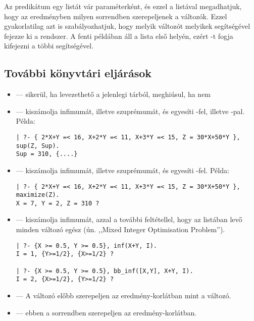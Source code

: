 Az  predikátum egy listát vár paraméterként, és ezzel a
listával megadhatjuk, hogy az eredményben milyen sorrendben szerepeljenek
a változók. Ezzel gyakorlatilag azt is szabályozhatjuk, hogy melyik változót
melyikek segítségével fejezze ki a rendszer. A fenti példában  áll a
lista első helyén, ezért -t fogja kifejezni a többi segítségével.

\subsection{További könyvtári eljárások}

\begin{itemize}
\item {} --- sikerül, ha  levezethető a
jelenlegi tárból, meghiúsul, ha nem

\item {} --- kiszámolja  infimumát,
illetve szuprémumát, és egyesíti -fel, illetve -pal.
Példa:

\begin{verbatim}
| ?- { 2*X+Y =< 16, X+2*Y =< 11, X+3*Y =< 15, Z = 30*X+50*Y }, sup(Z, Sup).
Sup = 310, {....}
\end{verbatim}

\item {} --- kiszámolja  infimumát,
illetve szuprémumát, és egyesíti -fel. Példa:

\begin{verbatim}
| ?- { 2*X+Y =< 16, X+2*Y =< 11, X+3*Y =< 15, Z = 30*X+50*Y }, maximize(Z).
X = 7, Y = 2, Z = 310 ?
\end{verbatim}

\item {} --- kiszámolja  infimumát,
azzal a további feltétellel, hogy az  listában levő minden
változó egész (ún. ,,Mixed Integer Optimisation Problem'').

\begin{verbatim}
| ?- {X >= 0.5, Y >= 0.5}, inf(X+Y, I).
I = 1, {Y>=1/2}, {X>=1/2} ?

| ?- {X >= 0.5, Y >= 0.5}, bb_inf([X,Y], X+Y, I).
I = 2, {X>=1/2}, {Y>=1/2} ?
\end{verbatim}

\item {} --- A  változó előbb szerepeljen az
eredmény-korlátban mint a  változó.

\item {} ---  ebben a sorrendben
szerepeljen az eredmény-korlátban.

\end{itemize}

